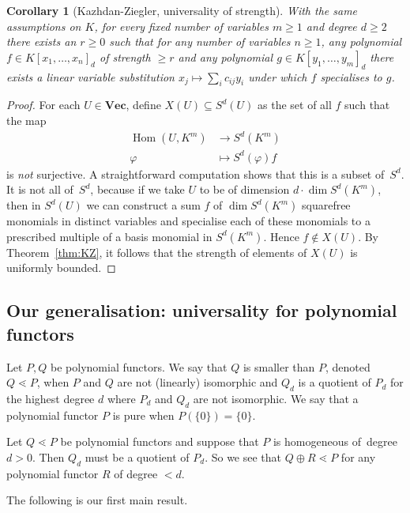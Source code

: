 \documentclass{amsart}
\theoremstyle{plain}
\newtheorem{cor}[thm]{Corollary}
\theoremstyle{definition}
\renewcommand{\phi}{\varphi}
\DeclareMathOperator{\Hom}{Hom}
\renewcommand{\Vec}{\mathbf{Vec}}
\begin{document}
\begin{cor}[Kazhdan-Ziegler, universality of strength]
With the same assumptions on $K$, for every fixed number of variables $m\geq1$ and degree $d\geq2$ there exists an $r\geq0$ such that for any number of variables $n\geq 1$, any polynomial $f \in K[x_1,\ldots,x_n]_d$ of strength $\geq r$ and any polynomial $g \in K[y_1,\ldots,y_m]_d$ there exists a linear variable substitution $x_j
\mapsto \sum_{i} c_{ij} y_i$ under which $f$ specialises to $g$.
\end{cor}
\begin{proof}
For each $U \in \Vec$, define $X(U) \subseteq S^d(U)$ as the set of all $f$
such that the map
\begin{align*}
\Hom(U,K^m) &\to S^d(K^m)\\
\phi &\mapsto S^d(\phi)f
\end{align*}
is {\em not} surjective. A straightforward computation shows that this
is a subset of~$S^d$. It is not all of~$S^d$, because if we take $U$ to
be of dimension $d \cdot \dim S^d(K^m)$, then in $S^d(U)$ we can construct
a sum $f$ of $\dim S^d(K^m)$ squarefree monomials in distinct variables
and specialise each of these monomials to a prescribed multiple of a basis
monomial in $S^d(K^m)$. Hence $f \not \in X(U)$.  By Theorem~\ref{thm:KZ},
it follows that the strength of elements of $X(U)$ is uniformly bounded.
\end{proof}

\subsection{Our generalisation: universality for polynomial functors}

Let $P,Q$ be polynomial functors. We say that $Q$ is smaller than $P$, denoted $Q\lessdot P$, when $P$ and $Q$ are not (linearly) isomorphic and $Q_d$ is a quotient of $P_d$ for the highest degree $d$ where $P_d$ and $Q_d$ are not isomorphic.
We say that a polynomial functor $P$ is pure when $P(\{0\})=\{0\}$.

\begin{re}\label{re:degen+finstrength}
Let $Q\lessdot P$ be polynomial functors and suppose that $P$ is homogeneous of~degree $d>0$. Then $Q_d$ must be a quotient of $P_d$. So we see that $Q\oplus R\lessdot P$ for any polynomial functor $R$ of degree $<d$.
\end{re}


The following is our first main result.
\end{document}
